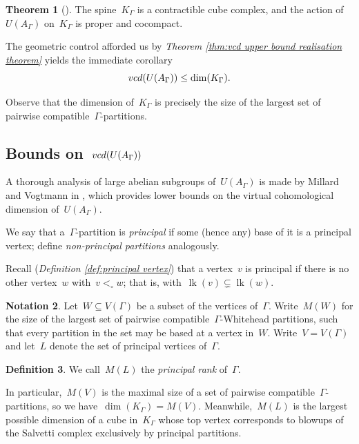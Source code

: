 \documentclass[11pt]{amsart}
\theoremstyle{definition}
\theoremstyle{definition}
\theoremstyle{definition}
\theoremstyle{definition}
\newtheorem{theorem}{Theorem}[section]
\newtheorem{definition}[theorem]{Definition}
\newtheorem{notation}[theorem]{Notation}
\newcommand{\uag}{U(A_{\Gamma})} %
\newcommand{\vcduag}{\textsc{vcd}(U(A_{\Gamma}))} %
\newcommand{\link}[1]{\operatorname{lk}({#1})} %
\newcommand{\spine}{K_{\Gamma}} %
\begin{document}
\begin{theorem}[\cite{CharneyStambaughVogtmannUntwistedOuterSpace17}]\label{thm:Charney-Stambaugh-Vogtmann main theorem}
    The spine~$\spine$ is a contractible cube complex, and the action of~$\uag$ on~$\spine$ is proper and cocompact.
\end{theorem}

The geometric control afforded us by \emph{Theorem \ref{thm:vcd upper bound realisation theorem}} yields the immediate corollary
\[\vcduag \leq \dim(\spine).\]

\noindent Observe that the dimension of~$\spine$ is precisely the size of the largest set of pairwise compatible~$\Gamma$-partitions. 

\subsection{Bounds on~$\vcduag$}\label{subsec:bounds on vcd of untwisted subgp}

A thorough analysis of large abelian subgroups of~$\uag$ is made by Millard and Vogtmann in \cite{MillardVogtmannCubeComplexes21}, which provides lower bounds on the virtual cohomological dimension of~$\uag$.

We say that a~$\Gamma$-partition is \emph{principal} if some (hence any) base of it is a principal vertex; define \emph{non-principal partitions} analogously.

Recall (\textit{Definition \ref{def:principal vertex}}) that a vertex~$v$ is principal if there is no other vertex~$w$ with~$v <_\circ w$; that is, with~$\link{v} \subsetneq \link{w}$.

\begin{notation}
    Let~$W \subseteq V(\Gamma)$ be a subset of the vertices of~$\Gamma$. Write~$M(W)$ for the size of the largest set of pairwise compatible~$\Gamma$-Whitehead partitions, such that every partition in the set may be based at a vertex in~$W$. Write~$V = V(\Gamma)$ and let~$L$ denote the set of principal vertices of~$\Gamma$.
\end{notation}

\begin{definition}\label{def:principal rank}
    We call~$M(L)$ the \emph{principal rank} of~$\Gamma$.
\end{definition}

In particular,~$M(V)$ is the maximal size of a set of pairwise compatible~$\Gamma$-partitions, so we have~$\dim(\spine) = M(V)$. Meanwhile,~$M(L)$ is the largest possible dimension of a cube in~$\spine$ whose top vertex corresponds to blowups of the Salvetti complex exclusively by principal partitions.
\end{document}
